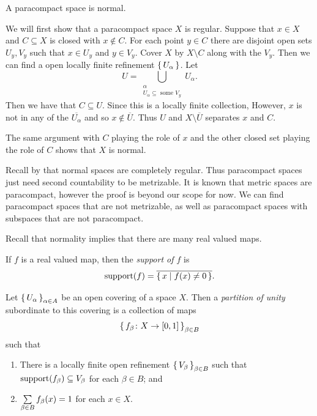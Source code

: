 \documentclass[letterpaper, 11pt, oneside]{book}
\begin{document}
\begin{thrm}\label{thrm: paracompact_is_normal}
  A paracompact space is normal.
\end{thrm}
\begin{pf}
  We will first show that a paracompact space $X$ is regular.
  Suppose that $x \in X$ and $C \subseteq X$ is closed with $x \notin C$.
  For each point $y \in C$ there are disjoint open sets $U_{y}, V_{y}$ such that $x \in U_{y}$ and $y \in V_{y}$.
  Cover $X$ by $X \setminus C$ along with the $V_{y}$.
  Then we can find a open locally finite refinement $\set{U_{\alpha}}$.
  Let
  \[
    U = \bigcup_{\substack{\alpha \\ U_{\alpha} \subseteq \text{ some } V_{y}}} U_{\alpha}.
  \]
  Then we have that $C \subseteq U$.
  Since this is a locally finite collection, 
  However, $x$ is not in any of the $\overline{U_{\alpha}}$ and so $x \notin \overline{U}$.
  Thus $U$ and $X \setminus \overline{U}$ separates $x$ and $C$.

  The same argument with $C$ playing the role of $x$ and the other closed set playing the role of $C$ shows that $X$ is normal.
\end{pf}

Recall by  that normal spaces are completely regular.
Thus paracompact spaces just need second countability to be metrizable.
It is known that metric spaces are paracompact, however the proof is beyond our scope for now.
We can find paracompact spaces that are not metrizable, as well as paracompact spaces with subspaces that are not paracompact.

Recall that normality implies that there are many real valued maps.
\begin{defn}[Support]
  If $f$ is a real valued map, then the \emph{support of $f$} is
  \[
    \operatorname{support}(f) = \overline{\set{x | f(x) \neq 0}}.
  \]
\end{defn}

\begin{defn}
  Let $\set{U_{\alpha}}_{\alpha \in A}$ be an open covering of a space $X$.
  Then a \emph{partition of unity} subordinate to this covering is a collection of maps
  \[
    \set{f_{\beta}\colon X \to [0, 1]}_{\beta \in B}
  \]
  such that
  \begin{enumerate}
  \item There is a locally finite open refinement $\set{V_{\beta}}_{\beta \in B}$ such that $\operatorname{support}(f_{\beta}) \subseteq V_{\beta}$ for each $\beta \in B$; and
  \item $\sum\limits_{\beta \in B} f_{\beta}(x) = 1$ for each $x \in X$.
  \end{enumerate}
\end{defn}
\end{document}
